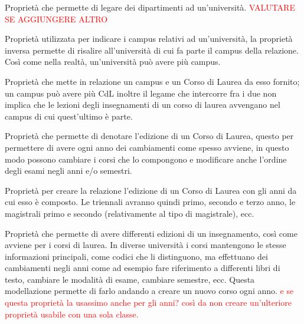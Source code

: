 \begin{itemize}
    
    {Proprietà che permette di legare dei dipartimenti ad un'università. \textcolor{red}{VALUTARE SE AGGIUNGERE ALTRO}}
  
    {Proprietà utilizzata per indicare i campus relativi ad un'università, la proprietà inversa permette di risalire all'università di cui fa parte il campus della relazione.
    \\
    Così come nella realtà, un'università può avere più campus.}

    {Proprietà che mette in relazione un campus e un Corso di Laurea da esso fornito; un campus può avere più CdL inoltre il legame che intercorre fra i due non implica che le lezioni degli insegnamenti di un corso di laurea avvengano nel campus di cui quest'ultimo è parte.}

    {Proprietà che permette di denotare l'edizione di un Corso di Laurea, questo per permettere di avere ogni anno dei cambiamenti come spesso avviene, in questo modo possono cambiare i corsi che lo compongono e modificare anche l'ordine degli esami negli anni e/o semestri.}

    {Proprietà per creare la relazione l'edizione di un Corso di Laurea con gli anni da cui esso è composto. Le triennali avranno quindi primo, secondo e terzo anno, le magistrali primo e secondo (relativamente al tipo di magistrale), ecc.}
    

    {Proprietà che permette di avere differenti edizioni di un insegnamento, così come avviene per i corsi di laurea. In diverse università i corsi mantengono le stesse informazioni principali, come codici che li distinguono, ma effettuano dei cambiamenti negli anni come ad esempio fare riferimento a differenti libri di testo, cambiare le modalità di esame, cambiare semestre, ecc. Questa modellazione permette di farlo andando a creare un nuovo corso ogni anno.
    \textcolor{red}{e se questa proprietà la usassimo anche per gli anni? così da non creare un'ulteriore proprietà usabile con una sola classe.}}


\end{itemize}

